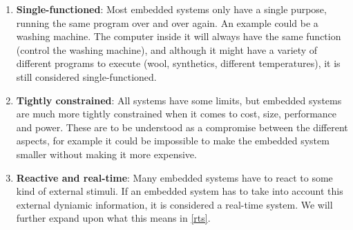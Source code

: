 \begin{enumerate}
  \item \textbf{Single-functioned}: Most embedded systems only have a single
  purpose, running the same program over and over again. An example could be a
  washing machine. The computer inside it will always have the same
  function (control the washing machine), and although it might have a variety
  of different programs to execute (wool, synthetics, different temperatures),
  it is still considered single-functioned.
  \item \textbf{Tightly constrained}: All systems have some limits, but embedded
  systems are much more tightly constrained when it comes to cost, size,
  performance and power. These are to be understood as a compromise between the
  different aspects, for example it could be impossible to make the embedded
  system smaller without making it more expensive.
  \item \textbf{Reactive and real-time}: Many embedded systems have to react to
  some kind of external stimuli. If an embedded system has to take into account
  this external dyniamic information, it is considered a real-time system. We
  will further expand upon what this means in \autoref{rts}.
\end{enumerate}
